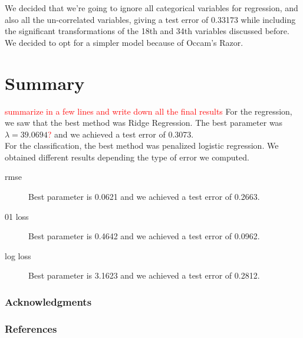 \documentclass{article} %
\begin{document}
We decided that we’re going to ignore all categorical variables for regression, and also all the un-correlated variables, giving a test error of 0.33173 while including the significant transformations of the 18th and 34th variables discussed before. We decided to opt for a simpler model because of Occam’s Razor.
\section{Summary}
\textcolor{red}{summarize in a few lines and write down all the final results}
For the regression, we saw that the best method was Ridge Regression. The best parameter was $\lambda =  39.0694$\textcolor{red}{?} and we achieved a test error of 0.3073.\\

For the classification, the best method was penalized logistic regression. We obtained different results depending the type of error we computed. \begin{description}
\item[rmse] Best parameter is 0.0621 and we achieved a test error of 0.2663.
\item[01 loss]Best parameter is 0.4642 and we achieved a test error of 0.0962.
\item[log loss] Best parameter is 3.1623 and we achieved a test error of 0.2812.
\end{description}

\subsubsection*{Acknowledgments}


\subsubsection*{References}
\end{document}
